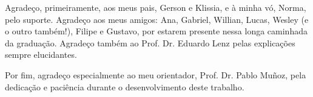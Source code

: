 

\begin{agradecimentos}
    Agradeço, primeiramente, aos meus pais, Gerson e Klissia, e à minha vó, Norma, pelo suporte. 
    Agradeço aos meus amigos: Ana, Gabriel, Willian, Lucas, Wesley (e o outro também!), Filipe e Gustavo, por estarem presente nessa longa caminhada da graduação.
    Agradeço também ao Prof. Dr. Eduardo Lenz pelas explicações sempre elucidantes.
    
    Por fim, agradeço especialmente ao meu orientador, Prof. Dr. Pablo Muñoz, pela dedicação e paciência durante o desenvolvimento deste trabalho.
\end{agradecimentos}
